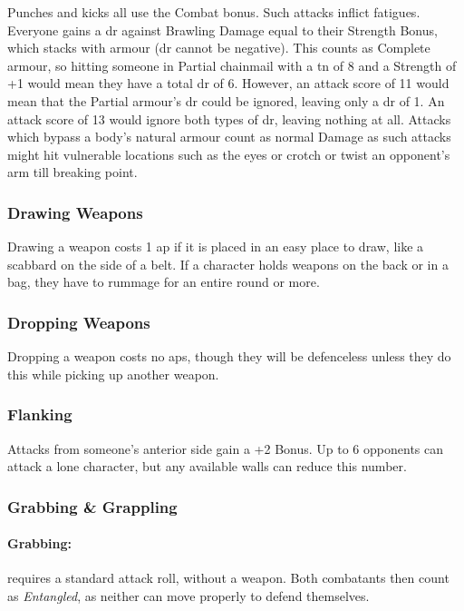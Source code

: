 \begin{multicols}{2}
Punches and kicks all use the Combat bonus.
Such attacks inflict \glspl{fatigue}.
Everyone gains a \gls{dr} against Brawling Damage equal to their Strength Bonus, which stacks with armour (\gls{dr} cannot be negative).
This counts as Complete armour, so hitting someone in Partial chainmail with a \gls{tn} of 8 and a Strength of +1 would mean they have a total \gls{dr} of 6.
However, an attack score of 11 would mean that the Partial armour's \gls{dr} could be ignored, leaving only a \gls{dr} of 1.
An attack score of 13 would ignore both types of \gls{dr}, leaving nothing at all.
Attacks which bypass a body's natural armour count as normal Damage as such attacks might hit vulnerable locations such as the eyes or crotch or twist an opponent's arm till breaking point.

\subsubsection[Drawing Weapon -- Cost: 1 \glsentrytext{ap}]{Drawing Weapons}

Drawing a weapon costs 1 \gls{ap} if it is placed in an easy place to draw, like a scabbard on the side of a belt.
If a character holds weapons on the back or in a bag, they have to rummage for an entire round or more.

\subsubsection[Dropping Weapon -- Cost: 0 \gls{ap}]{Dropping Weapons}

Dropping a weapon costs no \glspl{ap}, though they will be defenceless unless they do this while picking up another weapon.


\subsubsection[Flanking: Gain +2 to attack]{Flanking}\label{flank}

Attacks from someone's anterior side gain a +2 Bonus.
Up to 6 opponents can attack a lone character, but any available walls can reduce this number.

\subsubsection{Grabbing \& Grappling}
\label{grappling}

\paragraph[Grabs: Make an attack without any weapon bonus. Both combatants are \textit{Entangled}. Cost: 1 \gls{ap}]{Grabbing:}
requires a standard attack roll, without a weapon.
Both combatants then count as \textit{Entangled}, as neither can move properly to defend themselves.
\label{grab}


\end{multicols}
